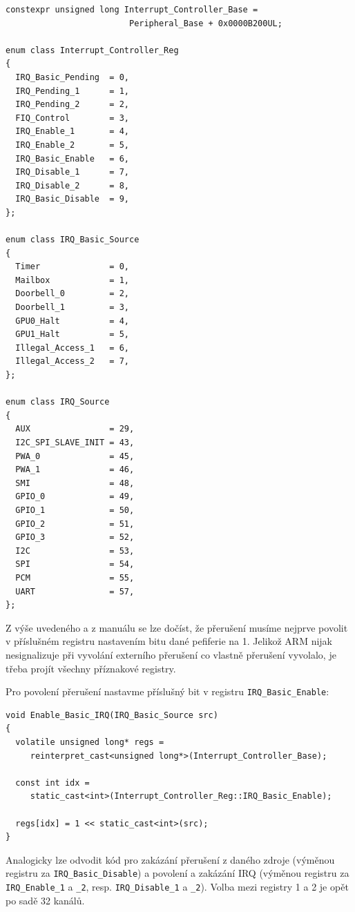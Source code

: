 \documentclass{article}
\begin{document}
\begin{lstlisting}
constexpr unsigned long Interrupt_Controller_Base =
                         Peripheral_Base + 0x0000B200UL;

enum class Interrupt_Controller_Reg
{
  IRQ_Basic_Pending  = 0,
  IRQ_Pending_1      = 1,
  IRQ_Pending_2      = 2,
  FIQ_Control        = 3,
  IRQ_Enable_1       = 4,
  IRQ_Enable_2       = 5,
  IRQ_Basic_Enable   = 6,
  IRQ_Disable_1      = 7,
  IRQ_Disable_2      = 8,
  IRQ_Basic_Disable  = 9,
};

enum class IRQ_Basic_Source
{
  Timer              = 0,
  Mailbox            = 1,
  Doorbell_0         = 2,
  Doorbell_1         = 3,
  GPU0_Halt          = 4,
  GPU1_Halt          = 5,
  Illegal_Access_1   = 6,
  Illegal_Access_2   = 7,
};

enum class IRQ_Source
{
  AUX                = 29,
  I2C_SPI_SLAVE_INIT = 43,
  PWA_0              = 45,
  PWA_1              = 46,
  SMI                = 48,
  GPIO_0             = 49,
  GPIO_1             = 50,
  GPIO_2             = 51,
  GPIO_3             = 52,
  I2C                = 53,
  SPI                = 54,
  PCM                = 55,
  UART               = 57,
};
\end{lstlisting}

Z výše uvedeného a z manuálu se lze dočíst, že přerušení musíme nejprve povolit v příslušném registru nastavením bitu dané pefiferie na 1. Jelikož ARM nijak nesignalizuje při vyvolání externího přerušení co vlastně přerušení vyvolalo, je třeba projít všechny příznakové registry.

Pro povolení  přerušení nastavme příslušný bit v registru \texttt{IRQ\_Basic\_Enable}:

\begin{lstlisting}
void Enable_Basic_IRQ(IRQ_Basic_Source src)
{
  volatile unsigned long* regs =
     reinterpret_cast<unsigned long*>(Interrupt_Controller_Base);
     
  const int idx =
     static_cast<int>(Interrupt_Controller_Reg::IRQ_Basic_Enable);
     
  regs[idx] = 1 << static_cast<int>(src);
}
\end{lstlisting}

Analogicky lze odvodit kód pro zakázání přerušení z daného zdroje (výměnou registru za \texttt{IRQ\_Basic\_Disable}) a povolení a zakázání  IRQ (výměnou registru za \texttt{IRQ\_Enable\_1} a \texttt{\_2}, resp. \texttt{IRQ\_Disable\_1} a \texttt{\_2}). Volba mezi registry 1 a 2 je opět po sadě 32 kanálů.
\end{document}
